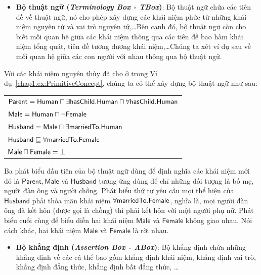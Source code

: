 \begin{itemize}
  \item \textbf{Bộ thuật ngữ ({\em Terminology Box - TBox})}: Bộ thuật ngữ chứa các tiên đề về thuật ngữ, nó cho phép xây dựng các khái niệm phức từ những khái niệm nguyên tử và vai trò nguyên tử,\ldots Bên cạnh đó, bộ thuật ngữ còn cho biết mối quan hệ giữa các khái niệm thông qua các tiên đề bao hàm khái niệm tổng quát, tiên đề tương đương khái niệm,\ldots Chúng ta xét ví dụ sau về mối quan hệ giữa các con người với nhau thông qua bộ thuật ngữ.
\end{itemize}
  
\begin{Example}\label{chap1.ex:TBox}
  Với các khái niệm nguyên thủy đã cho ở trong Ví dụ~\ref{chap1.ex:PrimitiveConcept}, chúng ta có thể xây dựng bộ thuật ngữ như sau:
  
  \begin{tabular}{l}
  $\mathsf{Parent = Human \sqcap \exists hasChild.Human \sqcap \forall hasChild.Human}$\\
  $\mathsf{Male = Human \sqcap \neg Female}$\\
  $\mathsf{Husband = Male \sqcap \exists marriedTo.Human}$\\
  $\mathsf{Husband \sqsubseteq \forall marriedTo.Female}$\\
  $\mathsf{Male \sqcap Female = \bot}$
  \end{tabular}\label{dádá}

  Ba phát biểu đầu tiên của bộ thuật ngữ dùng để định nghĩa các khái niệm mới đó là $\mathsf{Parent, Male}$ và $\mathsf{Husband}$ tương ứng dùng để chỉ những đối tượng là bố mẹ, người đàn ông và người chồng. Phát biểu thứ tư yêu cầu mọi thể hiện của $\mathsf{Husband}$ phải thỏa mãn khái niệm $\mathsf{\forall marriedTo.Female}$, nghĩa là, mọi người đàn ông đã kết hôn (được gọi là chồng) thì phải kết hôn với một người phụ nữ. Phát biểu cuối cùng để biểu diễn hai khái niệm $\mathsf{Male}$ và $\mathsf{Female}$ không giao nhau. Nói cách khác, hai khái niệm $\mathsf{Male}$ và $\mathsf{Female}$ là rời nhau.\myend
\end{Example}

\begin{itemize}
  \item \textbf{Bộ khẳng định ({\em Assertion Box - ABox})}: Bộ khẳng định chứa những khẳng định về các cá thể bao gồm khẳng định khái niệm, khẳng định vai trò, khẳng định đẳng thức, khẳng định bất đẳng thức, \ldots
\end{itemize}

